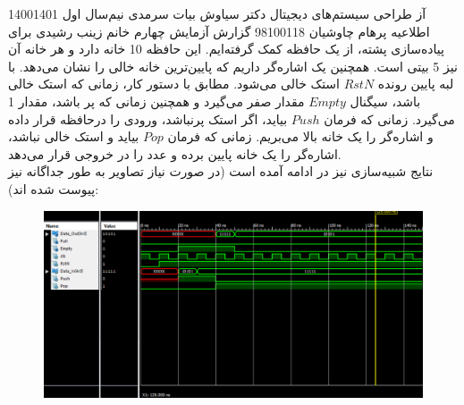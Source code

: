 \documentclass[a4paper,12pt]{article}
\begin{document}
\handout
{آز طراحی سیستم‌های دیجیتال}
{دکتر سیاوش بیات سرمدی}
{نیم‌سال اول 1400\lr{-}1401}
{اطلاعیه}
{پرهام چاوشیان}
{98100118}
 {گزارش آزمایش چهارم}
{خانم زینب رشیدی}
برای پیاده‌سازی پشته، از یک حافظه کمک گرفته‌ایم. این حافظه 10 خانه دارد و هر خانه آن نیز 5 بیتی است. همچنین یک اشاره‌گر داریم که پایین‌ترین خانه خالی را نشان ‌می‌دهد. با لبه پایین رونده $RstN$ استک خالی می‌شود. مطابق با دستور کار، زمانی که استک خالی باشد، سیگنال $Empty$ مقدار صفر می‌گیرد و همچنین زمانی که پر باشد، مقدار 1 می‌گیرد. زمانی که فرمان $Push$ بیاید، اگر استک پرنباشد، ورودی را درحافظه قرار داده و اشاره‌گر را یک خانه بالا می‌بریم. زمانی که فرمان $Pop$ بیاید و استک خالی نباشد، اشاره‌گر را یک خانه پایین برده و عدد را در خروجی قرار می‌دهد.\\
نتایج شبیه‌سازی نیز در ادامه آمده است (در صورت نیاز تصاویر به طور جداگانه نیز پیوست شده اند):
\begin{figure}[H]
 \centering
  \includegraphics[width=0.8\linewidth]{s1}
\end{figure}
\end{document}
